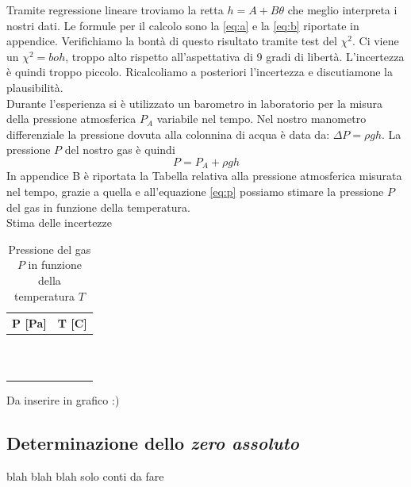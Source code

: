 Tramite regressione lineare troviamo la retta $h = A+B\theta$ che meglio interpreta i nostri dati. 
Le formule per il calcolo sono la \eqref{eq:a} e la \eqref{eq:b} riportate in appendice.
Verifichiamo la bontà di questo risultato tramite test del $\chi^2$. Ci viene un $\chi^2=boh$, troppo alto rispetto all'aspettativa di 9 gradi di libertà.
L'incertezza è quindi troppo piccolo. 
Ricalcoliamo a posteriori l'incertezza e discutiamone la plausibilità.\\
\newline
Durante l'esperienza si è utilizzato un barometro in laboratorio per la misura della pressione atmosferica $P_A$ variabile nel tempo. Nel nostro manometro differenziale la pressione dovuta alla colonnina di acqua è data da: $\Delta P = \rho gh$. 
La pressione $P$ del nostro gas è quindi 
\begin{equation}
\label{eq:p}
P = P_A + \rho gh
\end{equation}
In appendice B è riportata la Tabella relativa alla pressione atmosferica misurata nel tempo, grazie a quella e all'equazione \eqref{eq:p} possiamo stimare la pressione $P$ del gas in funzione della temperatura.\\
Stima delle incertezze\\
\begin{table}[H]
	\centering
	\begin{tabular}{|c|c|} \hline
		\textbf{P {[Pa]} } & \textbf{T {[\degree C]} }  \\ \hline
		 &   \\ \hline
		 &   \\ \hline
		 &   \\ \hline
		 &   \\ \hline
		 &   \\ \hline
		 &   \\ \hline
		 &   \\ \hline
		 &   \\ \hline
		 &   \\ \hline
		 &   \\ \hline
		 &   \\ \hline
	\end{tabular}
	\caption{Pressione del gas $P$ in funzione della temperatura $T$}
\end{table}

Da inserire in grafico :)

\subsection{Determinazione dello \emph{zero assoluto}}
blah blah blah solo conti da fare 
